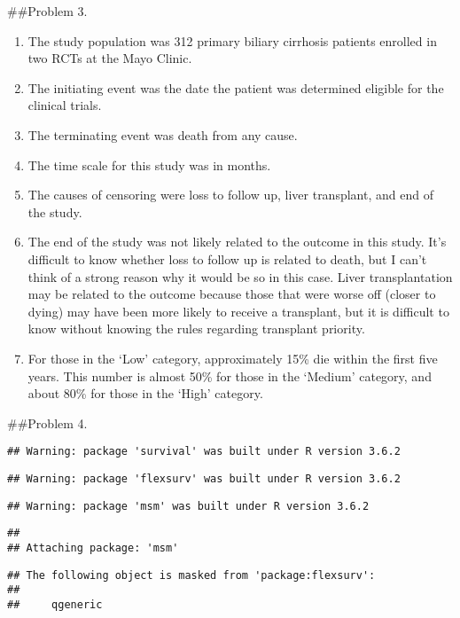 \documentclass[
]{article}
\begin{document}
\#\#Problem 3.

\begin{enumerate}
\def\labelenumi{(\alph{enumi})}
\item
  The study population was 312 primary biliary cirrhosis patients
  enrolled in two RCTs at the Mayo Clinic.
\item
  The initiating event was the date the patient was determined eligible
  for the clinical trials.
\item
  The terminating event was death from any cause.
\item
  The time scale for this study was in months.
\item
  The causes of censoring were loss to follow up, liver transplant, and
  end of the study.
\item
  The end of the study was not likely related to the outcome in this
  study. It's difficult to know whether loss to follow up is related to
  death, but I can't think of a strong reason why it would be so in this
  case. Liver transplantation may be related to the outcome because
  those that were worse off (closer to dying) may have been more likely
  to receive a transplant, but it is difficult to know without knowing
  the rules regarding transplant priority.
\item
  For those in the `Low' category, approximately 15\% die within the
  first five years. This number is almost 50\% for those in the `Medium'
  category, and about 80\% for those in the `High' category.
\end{enumerate}

\#\#Problem 4.

\begin{verbatim}
## Warning: package 'survival' was built under R version 3.6.2
\end{verbatim}

\begin{verbatim}
## Warning: package 'flexsurv' was built under R version 3.6.2
\end{verbatim}

\begin{verbatim}
## Warning: package 'msm' was built under R version 3.6.2
\end{verbatim}

\begin{verbatim}
## 
## Attaching package: 'msm'
\end{verbatim}

\begin{verbatim}
## The following object is masked from 'package:flexsurv':
## 
##     qgeneric
\end{verbatim}
\end{document}
